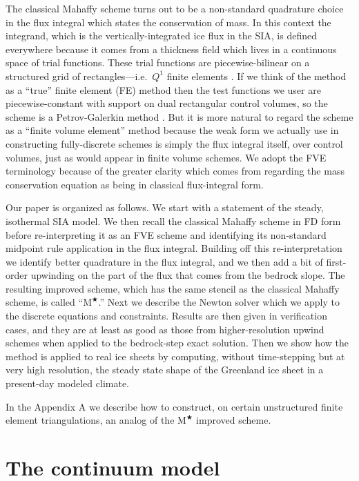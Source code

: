 \documentclass[twocolumn,letterpaper]{igs}
\newcommand{\Mstar}{$\text{M}^{\bigstar}$\xspace}
\begin{document}
The classical Mahaffy scheme turns out to be a non-standard quadrature choice in the flux integral which states the conservation of mass.  In this context the integrand, which is the vertically-integrated ice flux in the SIA, is defined everywhere because it comes from a thickness field which lives in a continuous space of trial functions.  These trial functions are piecewise-bilinear on a structured grid of rectangles---i.e.~$Q^1$ finite elements \citep{Elmanetal2005}.  If we think of the method as a ``true'' finite element (FE) method then the test functions we user are piecewise-constant with support on dual rectangular control volumes, so the scheme is a Petrov-Galerkin method \citep{Elmanetal2005}.  But it is more natural to regard the scheme as a ``finite volume element'' \citep[FVE;][]{Cai1990,EwingLinLin2002} method because the weak form we actually use in constructing fully-discrete schemes is simply the flux integral itself, over control volumes, just as would appear in finite volume \citep[FV;][]{LeVeque2002} schemes.  We adopt the FVE terminology because of the greater clarity which comes from regarding the mass conservation equation as being in classical flux-integral form.

Our paper is organized as follows.  We start with a statement of the steady, isothermal SIA model.  We then recall the classical Mahaffy scheme in FD form before re-interpreting it as an FVE scheme and identifying its non-standard midpoint rule application in the flux integral.  Building off this re-interpretation we identify better quadrature in the flux integral, and we then add a bit of first-order upwinding on the part of the flux that comes from the bedrock slope.  The resulting improved scheme, which has the same stencil as the classical Mahaffy scheme, is called ``\Mstar.''  Next we describe the Newton solver which we apply to the discrete equations and constraints.  Results are then given in verification cases, and they are at least as good as those from higher-resolution upwind schemes when applied to the \cite{JaroschSchoofAnslow2013} bedrock-step exact solution.  Then we show how the method is applied to real ice sheets by computing, without time-stepping but at very high resolution, the steady state shape of the Greenland ice sheet in a present-day modeled climate.

In the Appendix A we describe how to construct, on certain unstructured finite element triangulations, an analog of the \Mstar improved scheme.


\section*{The continuum model}
\end{document}
